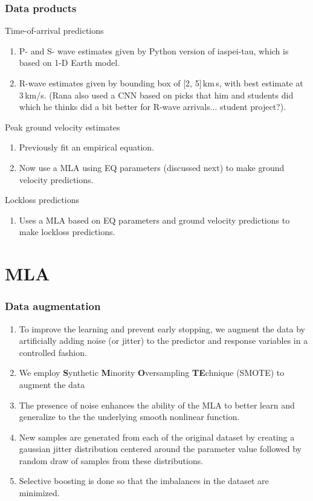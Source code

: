 \documentclass[ignorenonframetext,t,10pt]{beamer}
\begin{document}
\begin{frame}
\frametitle{Data products}

Time-of-arrival predictions
  \begin{enumerate}
  \item P- and S- wave estimates given by Python version of iaspei-tau, which is based on 1-D Earth model.
  \item R-wave estimates given by bounding box of [2, 5]\,km\,s, with best estimate at 3\,km/s. (Rana also used a CNN based on picks that him and students did which he thinks did a bit better for R-wave arrivals... student project?).
  \end{enumerate}

Peak ground velocity estimates
  \begin{enumerate}
\item Previously fit an empirical equation.
\item Now use a MLA using EQ parameters (discussed next) to make ground velocity predictions.
  \end{enumerate}
  
Lockloss predictions
  \begin{enumerate}
\item Uses a MLA based on EQ parameters and ground velocity predictions to make lockloss predictions.
  \end{enumerate}
  
\end{frame}

\section{MLA}

\begin{frame}
\frametitle{Data augmentation}

\begin{enumerate}
\item To improve the learning and prevent early stopping, we augment the data by artificially adding noise (or jitter) to the predictor and response variables in a controlled fashion. 
\item We employ \textbf{S}ynthetic \textbf{M}inority \textbf{O}versampling \textbf{TE}chnique (SMOTE) to augment the data 
\item The presence of noise enhances the ability of the MLA to better learn and generalize to the the underlying smooth nonlinear function. 
\item New samples are generated from each of the original dataset by creating a gaussian jitter distribution centered around the parameter value followed by random draw of samples from these distributions. 
\item Selective boosting is done so that the imbalances in the dataset are minimized. 
\end{enumerate}

\end{frame}
\end{document}

